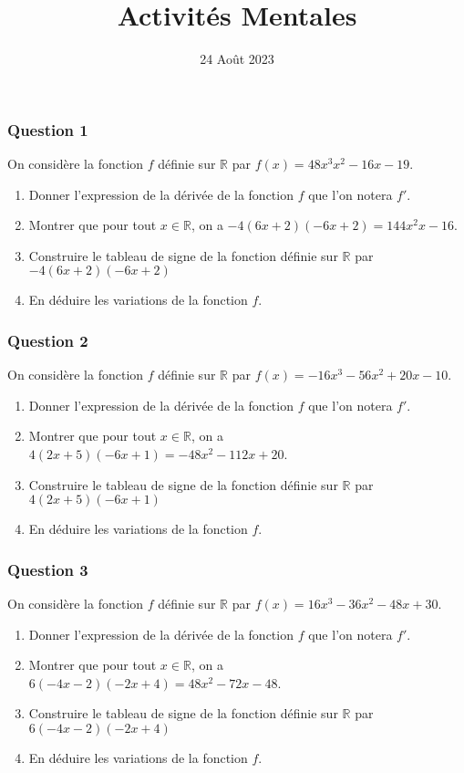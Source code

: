 \documentclass[15pt, mathserif]{beamer}
\title{Activités Mentales}
\date{24 Août 2023}
\newcommand{\R}{\mathbb{R}}			%
\begin{document}
\begin{frame}
    \titlepage
\end{frame}

\begin{frame} 
	\frametitle{Question 1}
On considère la fonction $f$ définie sur $\R$ par $f(x)=48x^3 x^2-16x-19$. \begin{enumerate} 
 	 \item Donner l'expression de la dérivée de la fonction $f$ que l'on notera $f'$. 
 	 \item Montrer que pour tout $x \in \R$, on a $-4(6x+2)(-6x+2)=144x^2x-16$. 
 	 \item Construire le tableau de signe de la fonction définie sur $\R$ par 
 \hfil$-4(6x+2)(-6x+2)$ 
 	 \item En déduire les variations de la fonction $f$. 
 
 \end{enumerate} 
 
 \end{frame}


\begin{frame} 
	\frametitle{Question 2}
On considère la fonction $f$ définie sur $\R$ par $f(x)=-16x^3 -56x^2+20x-10$. \begin{enumerate} 
 	 \item Donner l'expression de la dérivée de la fonction $f$ que l'on notera $f'$. 
 	 \item Montrer que pour tout $x \in \R$, on a $4(2x+5)(-6x+1)=-48x^2-112x+20$. 
 	 \item Construire le tableau de signe de la fonction définie sur $\R$ par 
 \hfil$4(2x+5)(-6x+1)$ 
 	 \item En déduire les variations de la fonction $f$. 
 
 \end{enumerate} 
 
 \end{frame}


\begin{frame} 
	\frametitle{Question 3}
On considère la fonction $f$ définie sur $\R$ par $f(x)=16x^3 -36x^2-48x+30$. \begin{enumerate} 
 	 \item Donner l'expression de la dérivée de la fonction $f$ que l'on notera $f'$. 
 	 \item Montrer que pour tout $x \in \R$, on a $6(-4x-2)(-2x+4)=48x^2-72x-48$. 
 	 \item Construire le tableau de signe de la fonction définie sur $\R$ par 
 \hfil$6(-4x-2)(-2x+4)$ 
 	 \item En déduire les variations de la fonction $f$. 
 
 \end{enumerate} 
 
 \end{frame}
\end{document}
